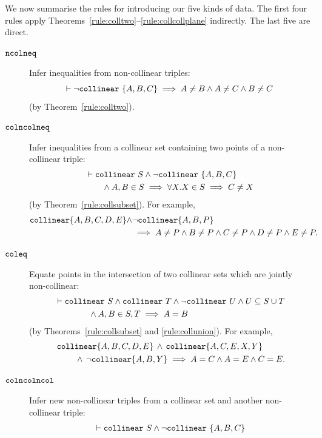 We now summarise the rules for introducing our five kinds of data. The first four rules apply Theorems~\ref{rule:colltwo}--\ref{rule:collcollplane} indirectly. The last five are direct.
\begin{description}
\item[$\texttt{ncolneq}$] Infer inequalities from non-collinear triples:
\begin{displaymath}
\vdash\neg\texttt{collinear}\ \{A,B,C\} \implies A \neq B \wedge A \neq C \wedge B \neq C
\end{displaymath} (by Theorem~\ref{rule:colltwo}).
\item[$\texttt{colncolneq}$] Infer inequalities from a collinear set containing two points of a non-collinear triple:
\begin{align*}
  &\vdash\code{collinear}\ S \wedge \neg\code{collinear}\ \{A,B,C\}\\
  &\qquad\wedge A,B \in S \implies \forall X. X \in S \implies C \neq X
\end{align*}(by Theorem~\ref{rule:collsubset}). For example, 
\begin{align*}
\texttt{collinear} \{A, B, C, D, E\} \wedge & \neg\texttt{collinear} \{A, B, P\}\\
&\implies A \neq P \wedge B \neq P \wedge C \neq P \wedge D \neq P \wedge E \neq P.
\end{align*}
\item[$\texttt{coleq}$]\label{rule:coleq}
Equate points in the intersection of two collinear sets which are jointly non-collinear:
\begin{align*}
&\vdash\texttt{collinear}\ S \wedge \texttt{collinear}\ T \wedge \neg\texttt{collinear}\ U \wedge U \subseteq S \cup T \\
&\qquad\qquad\wedge A,B \in S,T \implies A = B
\end{align*} (by Theorems~\ref{rule:collsubset} and \ref{rule:collunion}). For example,
\begin{align*}\
&\texttt{collinear} \{A, B, C, D, E\} \,\wedge\,\texttt{collinear} \{A, C, E, X, Y\}\\ 
&\qquad\, \wedge\,\neg\texttt{collinear} \{A, B, Y\}\implies A = C \wedge A = E \wedge C = E.
\end{align*}
\item[$\texttt{colncolncol}$] Infer new non-collinear triples from a collinear set and another non-collinear triple:
\begin{align*}
  &\vdash\code{collinear}\ S \wedge \neg\code{collinear}\ \{A,B,C\}\\

\end{align*}
\end{description}
